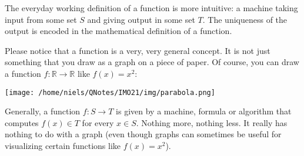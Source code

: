The everyday working definition of a
function is more intuitive: a machine taking input from some set
$S$ and giving output in some set $T$. The uniqueness of the output
is encoded in the mathematical definition of a function.

\begin{tcolorbox}\begin{remark}\label{graphremark}
    Please notice that a function is a very, very general concept. It is not just something
    that you draw as a graph on a piece of paper. Of course, you can draw a function
    $f:\mathbb{R}\rightarrow \mathbb{R}$ like $f(x) = x^2$:
    \begin{center}\texttt{[image: /home/niels/QNotes/IMO21/img/parabola.png]}\end{center}
    Generally, a function $f: S\rightarrow T$ is given by a machine, formula or algorithm that
    computes $f(x)\in T$ for every $x\in S$. Nothing more, nothing less. It really has nothing to
    do with a graph (even though graphs can sometimes be useful for visualizing certain functions like $f(x) = x^2$).
  \end{remark}\end{tcolorbox}

